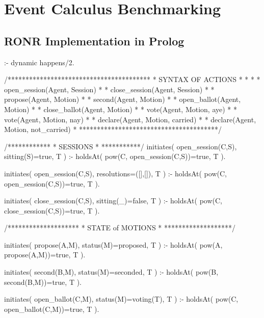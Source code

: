 
\chapter{Event Calculus Benchmarking}

\section{RONR Implementation in Prolog}\label{sec:ronrcode}

\begin{prologinline}[caption=Implementation of RONR in Prolog]
:- dynamic
    happens/2.

/****************************************
 * SYNTAX OF ACTIONS                    *
 *                                      *
 * open_session(Agent, Session)         *
 * close_session(Agent, Session)        *
 * propose(Agent, Motion)               *
 * second(Agent, Motion)                *
 * open_ballot(Agent, Motion)           *
 * close_ballot(Agent, Motion)          *
 * vote(Agent, Motion, aye)             *
 * vote(Agent, Motion, nay)             *
 * declare(Agent, Motion, carried)      *
 * declare(Agent, Motion, not_carried)  *
 ***************************************/                          

/************
 * SESSIONS *
 ***********/
initiates( open_session(C,S), sitting(S)=true, T ) :-
	holdsAt( pow(C, open_session(C,S))=true, T ).

initiates( open_session(C,S), resolutions=([],[]), T ) :-
	holdsAt( pow(C, open_session(C,S))=true, T ).

initiates( close_session(C,S), sitting(_)=false, T ) :-
	holdsAt( pow(C, close_session(C,S))=true, T ).

/********************
 * STATE of MOTIONS *
 *******************/


initiates( propose(A,M), status(M)=proposed, T ) :-
	holdsAt( pow(A, propose(A,M))=true, T ).

initiates( second(B,M), status(M)=seconded, T ) :-
	holdsAt( pow(B, second(B,M))=true, T ).

initiates( open_ballot(C,M), status(M)=voting(T), T ) :-
	holdsAt( pow(C, open_ballot(C,M))=true, T ).


\end{prologinline}

